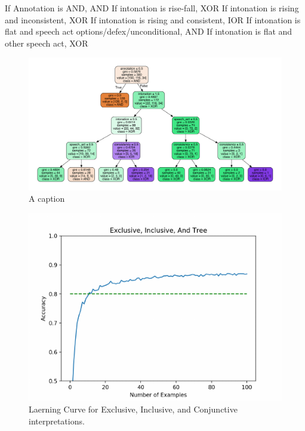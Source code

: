 \documentclass[oneside]{report}
\theoremstyle{definition}
\theoremstyle{definition}
\theoremstyle{definition}
\theoremstyle{remark}
\begin{document}
If Annotation is AND, AND \newline
If intonation is rise-fall, XOR \newline
If intonation is rising and inconsistent, XOR \newline
If intonation is rising and consistent, IOR \newline
If intonation is flat and speech act options/defex/unconditional, AND
\newline
If intonation is flat and other speech act, XOR \newline
\begin{figure}[tb]
\includegraphics[width=0.9\linewidth]{decision_trees/plots/exinand} \caption{A caption}\label{fig:exinandTree}
\end{figure}
\begin{figure}[tb]

{\centering \includegraphics{figs/exinandLearning-1} 

}

\caption{Laerning Curve for Exclusive, Inclusive, and Conjunctive interpretations.}\label{fig:exinandLearning}
\end{figure}
\end{document}
